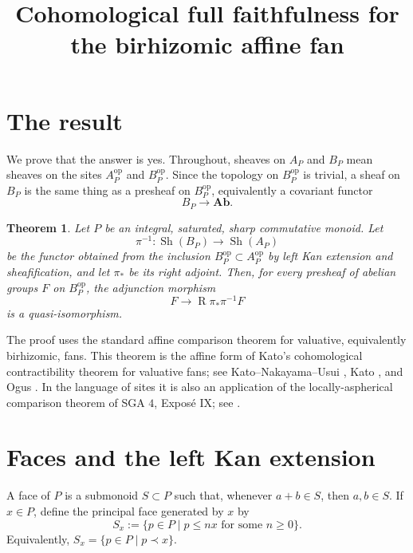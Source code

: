 \documentclass[11pt]{article}
\newtheorem{theorem}{Theorem}
\DeclareMathOperator{\Sh}{Sh}
\DeclareMathOperator{\R}{R}
\begin{document}
\title{Cohomological full faithfulness for the birhizomic affine fan}
\author{}
\date{}
\maketitle

\section*{The result}

We prove that the answer is yes.  Throughout, sheaves on \(A_P\) and \(B_P\) mean sheaves on the sites
\(A_P^{\mathrm{op}}\) and \(B_P^{\mathrm{op}}\).  Since the topology on \(B_P^{\mathrm{op}}\) is trivial, a sheaf on \(B_P\) is the same thing as a presheaf on \(B_P^{\mathrm{op}}\), equivalently a covariant functor
\[
B_P \longrightarrow \mathbf{Ab}.
\]

\begin{theorem}
Let \(P\) be an integral, saturated, sharp commutative monoid.  Let
\[
\pi^{-1} : \Sh(B_P) \longrightarrow \Sh(A_P)
\]
be the functor obtained from the inclusion \(B_P^{\mathrm{op}}\subset A_P^{\mathrm{op}}\) by left Kan extension and sheafification, and let \(\pi_*\) be its right adjoint.  Then, for every presheaf of abelian groups \(F\) on \(B_P^{\mathrm{op}}\), the adjunction morphism
\[
F \longrightarrow \R\pi_*\pi^{-1}F
\]
is a quasi-isomorphism.
\end{theorem}

The proof uses the standard affine comparison theorem for valuative, equivalently birhizomic, fans.  This theorem is the affine form of Kato's cohomological contractibility theorem for valuative fans; see Kato--Nakayama--Usui \cite[Section 3]{KNU}, Kato \cite[Sections 1--3]{Kato}, and Ogus \cite[Chapter V, Sections 1--2]{Ogus}.  In the language of sites it is also an application of the locally-aspherical comparison theorem of SGA \(4\), Exposé IX; see \cite[Exposé IX, Theorem 5.7]{SGA4}.

\section{Faces and the left Kan extension}

A face of \(P\) is a submonoid \(S\subset P\) such that, whenever \(a+b\in S\), then \(a,b\in S\).  If \(x\in P\), define the principal face generated by \(x\) by
\[
S_x := \{p\in P \mid p\leq n x \text{ for some } n\geq 0\}.
\]
Equivalently, \(S_x=\{p\in P\mid p\prec x\}\).
\end{document}

